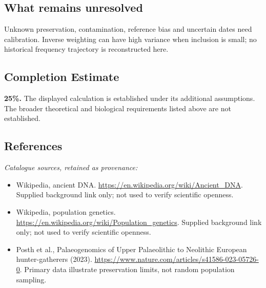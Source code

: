 \documentclass[11pt]{article}
\begin{document}
\subsection{What remains unresolved}
Unknown preservation, contamination, reference bias and uncertain dates need calibration. Inverse weighting can have high variance when inclusion is small; no historical frequency trajectory is reconstructed here.
\subsection{Completion Estimate}
\textbf{25\%.} The displayed calculation is established under its additional assumptions. The broader theoretical and biological requirements listed above are not established.
\subsection{References}
\noindent\emph{Catalogue sources, retained as provenance:}
\begin{itemize}
\item Wikipedia, ancient DNA. \url{https://en.wikipedia.org/wiki/Ancient_DNA}. Supplied background link only; not used to verify scientific openness.
\item Wikipedia, population genetics. \url{https://en.wikipedia.org/wiki/Population_genetics}. Supplied background link only; not used to verify scientific openness.
\item Posth et al., Palaeogenomics of Upper Palaeolithic to Neolithic European hunter-gatherers (2023). \url{https://www.nature.com/articles/s41586-023-05726-0}. Primary data illustrate preservation limits, not random population sampling.
\end{itemize}
\end{document}
